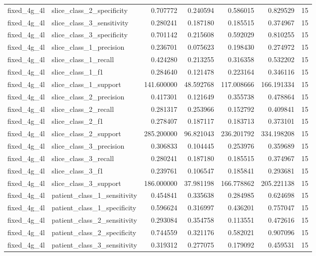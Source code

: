 \begin{tabular}{llrrrrr}
fixed_4g_4l & slice_class_2_specificity & 0.707772 & 0.240594 & 0.586015 & 0.829529 & 15 \\
fixed_4g_4l & slice_class_3_sensitivity & 0.280241 & 0.187180 & 0.185515 & 0.374967 & 15 \\
fixed_4g_4l & slice_class_3_specificity & 0.701142 & 0.215608 & 0.592029 & 0.810255 & 15 \\
fixed_4g_4l & slice_class_1_precision & 0.236701 & 0.075623 & 0.198430 & 0.274972 & 15 \\
fixed_4g_4l & slice_class_1_recall & 0.424280 & 0.213255 & 0.316358 & 0.532202 & 15 \\
fixed_4g_4l & slice_class_1_f1 & 0.284640 & 0.121478 & 0.223164 & 0.346116 & 15 \\
fixed_4g_4l & slice_class_1_support & 141.600000 & 48.592768 & 117.008666 & 166.191334 & 15 \\
fixed_4g_4l & slice_class_2_precision & 0.417301 & 0.121649 & 0.355738 & 0.478864 & 15 \\
fixed_4g_4l & slice_class_2_recall & 0.281317 & 0.253966 & 0.152792 & 0.409841 & 15 \\
fixed_4g_4l & slice_class_2_f1 & 0.278407 & 0.187117 & 0.183713 & 0.373101 & 15 \\
fixed_4g_4l & slice_class_2_support & 285.200000 & 96.821043 & 236.201792 & 334.198208 & 15 \\
fixed_4g_4l & slice_class_3_precision & 0.306833 & 0.104445 & 0.253976 & 0.359689 & 15 \\
fixed_4g_4l & slice_class_3_recall & 0.280241 & 0.187180 & 0.185515 & 0.374967 & 15 \\
fixed_4g_4l & slice_class_3_f1 & 0.239761 & 0.106547 & 0.185841 & 0.293681 & 15 \\
fixed_4g_4l & slice_class_3_support & 186.000000 & 37.981198 & 166.778862 & 205.221138 & 15 \\
fixed_4g_4l & patient_class_1_sensitivity & 0.454841 & 0.335638 & 0.284985 & 0.624698 & 15 \\
fixed_4g_4l & patient_class_1_specificity & 0.596624 & 0.316997 & 0.436201 & 0.757047 & 15 \\
fixed_4g_4l & patient_class_2_sensitivity & 0.293084 & 0.354758 & 0.113551 & 0.472616 & 15 \\
fixed_4g_4l & patient_class_2_specificity & 0.744559 & 0.321176 & 0.582021 & 0.907096 & 15 \\
fixed_4g_4l & patient_class_3_sensitivity & 0.319312 & 0.277075 & 0.179092 & 0.459531 & 15 \\

\end{tabular}
